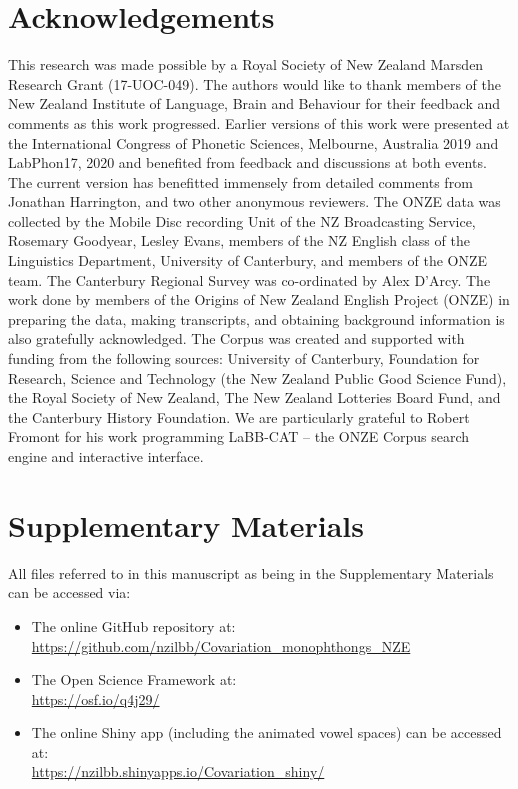 \documentclass[review]{elsarticle} %
\begin{document}
\vfill
\newpage

\section*{Acknowledgements}
\noindent This research was made possible by a Royal Society of New Zealand Marsden Research Grant (17-UOC-049). The authors would like to thank members of the New Zealand Institute of Language, Brain and Behaviour for their feedback and comments as this work progressed. Earlier versions of this work were presented at the International Congress of Phonetic Sciences, Melbourne, Australia 2019 and LabPhon17, 2020 and benefited from feedback and discussions at both events. The current version has benefitted immensely from detailed comments from Jonathan Harrington, and two other anonymous reviewers.  The ONZE data was collected by the Mobile Disc recording Unit of the NZ Broadcasting Service, Rosemary Goodyear, Lesley Evans, members of the NZ English class of the Linguistics Department, University of Canterbury, and members of the ONZE team. The Canterbury Regional Survey was co-ordinated by Alex D'Arcy. The work done by members of the Origins of New Zealand English Project (ONZE) in preparing the data, making transcripts, and obtaining background information is also gratefully acknowledged. The Corpus was created and supported with funding from the following sources: University of Canterbury, Foundation for Research, Science and Technology (the New Zealand Public Good Science Fund), the Royal Society of New Zealand, The New Zealand Lotteries Board Fund, and the Canterbury History Foundation.    We are particularly grateful to Robert Fromont for his work programming LaBB-CAT – the ONZE Corpus search engine and interactive interface.

\section*{Supplementary Materials}
\label{sec:supplementarymaterials}

\noindent All files referred to in this manuscript as being in the Supplementary Materials can be accessed via:

\begin{itemize}
    \item The online GitHub repository at:\\ \url{https://github.com/nzilbb/Covariation_monophthongs_NZE}
    \item The Open Science Framework at:\\ \url{https://osf.io/q4j29/}
    \item The online Shiny app (including the animated vowel spaces) can be accessed at:\\
    \url{https://nzilbb.shinyapps.io/Covariation_shiny/}
\end{itemize}
\end{document}
